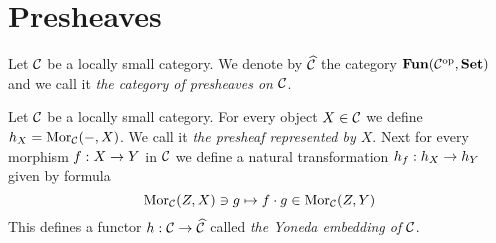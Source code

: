 \section{Presheaves}

\begin{definition}
Let ${\mathcal C}$ be a locally small category. We denote by $\widehat{{\mathcal C}}$ the category $\mathbf{Fun}({\mathcal C}^{\mathrm{op}},\mathbf{Set})$ and we call it \textit{the category of presheaves on ${\mathcal C}$}.
\end{definition}

\begin{definition}
Let ${\mathcal C}$ be a locally small category. For every object $X\in {\mathcal C}$ we define $h_X=\mathrm{Mor}_{{\mathcal C}}(-,X)$. We call it \textit{the presheaf represented by $X$}. Next for every morphism $f:X\rightarrow Y$ in ${\mathcal C}$ we define a natural transformation $h_f:h_X\rightarrow h_Y$ given by formula 
$$\mathrm{Mor}_{{\mathcal C}}(Z,X)\ni g \mapsto f\cdot g \in \mathrm{Mor}_{{\mathcal C}}(Z,Y)$$
This defines a functor $h:{\mathcal C}\rightarrow \widehat{{\mathcal C}}$ called \textit{the Yoneda embedding of ${\mathcal C}$}.
\end{definition}

